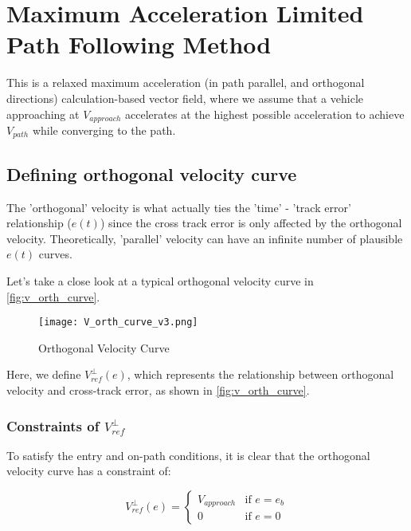 \chapter{Maximum Acceleration Limited Path Following Method}
\label{ch:appendix_max_accel}

This is a relaxed maximum acceleration (in path parallel, and orthogonal directions) calculation-based vector field, where we assume that a vehicle approaching at $V_{approach}$ accelerates at the highest possible acceleration to achieve $V_{path}$ while converging to the path.

\section{Defining orthogonal velocity curve}

The 'orthogonal' velocity is what actually ties the 'time' - 'track error' relationship ($e(t)$) since the cross track error is only affected by the orthogonal velocity. Theoretically, 'parallel' velocity can have an infinite number of plausible $e(t)$ curves.\newline

Let's take a close look at a typical orthogonal velocity curve in \autoref{fig:v_orth_curve}.

\begin{figure}[h]
\centering
\texttt{[image: V\_orth\_curve\_v3.png]}
\caption{\label{fig:v_orth_curve}Orthogonal Velocity Curve}
\end{figure}

Here, we define $V_{ref}^{\perp}(e)$, which represents the relationship between orthogonal velocity and cross-track error, as shown in \autoref{fig:v_orth_curve}.

\subsection{Constraints of $V_{ref}^{\perp}$}
To satisfy the entry and on-path conditions, it is clear that the orthogonal velocity curve has a constraint of:

\begin{equation}
V_{ref}^{\perp}(e)=\begin{cases}
    V_{approach}& \text{if $e = e_b$}\\
    0& \text{if $e = 0$}
\end{cases}
\label{eq:v_orth_constraints}
\end{equation}

